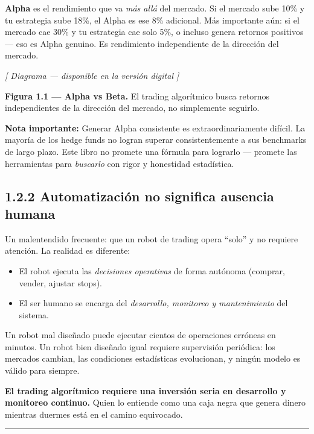 \documentclass[12pt, a4paper, twoside, openright]{book}
\providecommand{\tightlist}{%
  \setlength{\itemsep}{2pt}\setlength{\parskip}{0pt}}
\renewenvironment{quote}{%
  \begin{mdframed}[style=quotestyle]%
  \itshape\color{bkblue}%
}{%
  \end{mdframed}%
}
\numberwithin{figure}{chapter}
\numberwithin{table}{chapter}
\begin{document}
\textbf{Alpha} es el rendimiento que va \emph{más allá} del mercado. Si
el mercado sube 10\% y tu estrategia sube 18\%, el Alpha es ese 8\%
adicional. Más importante aún: si el mercado cae 30\% y tu estrategia
cae solo 5\%, o incluso genera retornos positivos --- eso es Alpha
genuino. Es rendimiento independiente de la dirección del mercado.

\emph{{[} Diagrama --- disponible en la versión digital {]}}

\textbf{Figura 1.1 --- Alpha vs Beta.} El trading algorítmico busca
retornos independientes de la dirección del mercado, no simplemente
seguirlo.

\begin{quote}
\textbf{Nota importante:} Generar Alpha consistente es
extraordinariamente difícil. La mayoría de los hedge funds no logran
superar consistentemente a sus benchmarks de largo plazo. Este libro no
promete una fórmula para lograrlo --- promete las herramientas para
\emph{buscarlo} con rigor y honestidad estadística.
\end{quote}

\subsection{1.2.2 Automatización no significa ausencia
humana}\label{automatizaciuxf3n-no-significa-ausencia-humana}

Un malentendido frecuente: que un robot de trading opera ``solo'' y no
requiere atención. La realidad es diferente:

\begin{itemize}
\tightlist
\item
  El robot ejecuta las \emph{decisiones operativas} de forma autónoma
  (comprar, vender, ajustar stops).
\item
  El ser humano se encarga del \emph{desarrollo, monitoreo y
  mantenimiento} del sistema.
\end{itemize}

Un robot mal diseñado puede ejecutar cientos de operaciones erróneas en
minutos. Un robot bien diseñado igual requiere supervisión periódica:
los mercados cambian, las condiciones estadísticas evolucionan, y ningún
modelo es válido para siempre.

\textbf{El trading algorítmico requiere una inversión seria en
desarrollo y monitoreo continuo.} Quien lo entiende como una caja negra
que genera dinero mientras duermes está en el camino equivocado.

\begin{center}\rule{0.5\linewidth}{0.5pt}\end{center}
\end{document}

